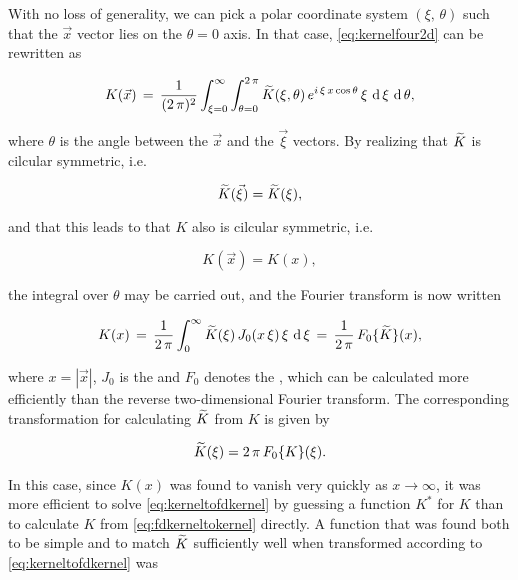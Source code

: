 With no loss of generality, we can pick a polar coordinate system $(\xi,\,\theta)$ such that the $\vec{x}$ vector lies on the $\theta = 0$ axis. In that case, \eqref{eq:kernelfour2d} can be rewritten as

\begin{equation}
K(\vec{x})\, = \,\frac{1}{(2\,\pi)^2}\int_{\xi=0}^\infty\int_{\theta=0}^{2\,\pi}\widetilde{K}(\xi, \theta)\,e^{i\,\xi\,x\cos\theta}\,\xi\,\operatorname{d}\xi\,\operatorname{d}\theta,
\end{equation}

where $\theta$ is the angle between the $\vec{x}$ and the $\vec{\xi}$ vectors. By realizing that $\widetilde{K}$ is cilcular symmetric, i.e.

\begin{equation}
\widetilde{K}(\vec{\xi}) = \widetilde{K}(\xi),
\end{equation}

and that this leads to that $K$ also is cilcular symmetric, i.e.

\begin{equation}
K(\vec{x}) = K(x),
\end{equation}

the integral over $\theta$ may be carried out, and the Fourier transform is now written

\begin{equation} \label{eq:fdkerneltokernel}
K(x)\, = \,\frac{1}{2\,\pi}\int_0^\infty\widetilde{K}(\xi)\,J_0(x\,\xi)\,\xi\,\operatorname{d}\xi\, = \,\frac{1}{2\,\pi}\,F_0\{\widetilde{K}\}(x),
\end{equation}

where $x = |\vec{x}|$, $J_0$ is the  and $F_0$ denotes the , which can be calculated more efficiently than the reverse two-dimensional Fourier transform. The corresponding transformation for calculating $\widetilde{K}$ from $K$ is given by

\begin{equation} \label{eq:kerneltofdkernel}
\widetilde{K}(\xi) = 2\,\pi\,F_0\{K\}(\xi).
\end{equation}

In this case, since $K(x)$ was found to vanish very quickly as $x\rightarrow\infty$, it was more efficient to solve \eqref{eq:kerneltofdkernel} by guessing a function $K^*$ for $K$ than to calculate $K$ from \eqref{eq:fdkerneltokernel} directly. A function that was found both to be simple and to match $\widetilde{K}$ sufficiently well when transformed according to \eqref{eq:kerneltofdkernel} was

